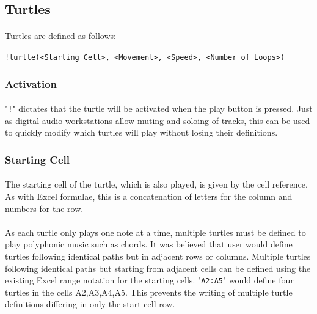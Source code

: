 \subsection{Turtles}

\paragraph{} Turtles are defined as follows:

\texttt{!turtle(<Starting Cell>, <Movement>, <Speed>, <Number of Loops>)}

\subsubsection{Activation}

\paragraph{} "\texttt{!}" dictates that the turtle will be activated when the play button is pressed. Just as digital audio workstations allow muting and soloing of tracks, this can be used to quickly modify which turtles will play without losing their definitions.

\subsubsection{Starting Cell}

\paragraph{} The starting cell of the turtle, which is also played, is given by the cell reference. As with Excel formulae, this is a concatenation of letters for the column and numbers for the row.

\paragraph{} As each turtle only plays one note at a time, multiple turtles must be defined to play polyphonic music such as chords. It was believed that user would define turtles following identical paths but in adjacent rows or columns. Multiple turtles following identical paths but starting from adjacent cells can be defined using the existing Excel range notation for the starting cells. "\texttt{A2:A5}" would define four turtles in the cells A2,A3,A4,A5. This prevents the writing of multiple turtle definitions differing in only the start cell row.


